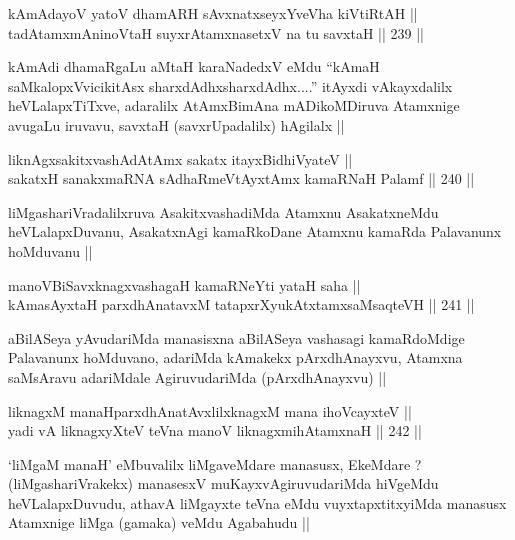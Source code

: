 \begin{shl}
kAmAdayoV yatoV dhamARH sAvxnatxseyxYveVha kiVtiRtAH || \\
tadAtamxmAninoV\s taH suyxrAtamxnasetxV na tu savxtaH ||  239 ||  
\end{shl}

\begin{artha}
kAmAdi dhamaRgaLu aMtaH karaNadedxV eMdu ``kAmaH saMkalopxVvicikitAsx
sharxdAdhx\s sharxdAdhx....'' itAyxdi vAkayxdalilx heVLalapxTiTxve,
adaralilx AtAmxBimAna mADikoMDiruva Atamxnige avugaLu iruvavu, savxtaH
(savxrUpadalilx) hAgilalx ||
\end{artha}

\begin{shl}
liknAgxsakitxvashAdAtAmx sakatx itayxBidhiVyateV || \\
sakatxH sanakxmaRNA sAdhaRmeVtAyxtAmx kamaRNaH Palamf ||  240 ||  
\end{shl}

\begin{artha}
liMgashariVradalilxruva AsakitxvashadiMda Atamxnu AsakatxneMdu
heVLalapxDuvanu, AsakatxnAgi kamaRkoDane Atamxnu kamaRda Palavanunx
hoMduvanu ||
\end{artha}

\begin{shl}
manoVBiSavxknagxvashagaH kamaRNeYti yataH saha || \\
kAmasAyxtaH parxdhAnatavxM tatapxrXyukAtxtamxsaMsaqteVH ||  241 ||  
\end{shl}

\begin{artha}
aBilASeya yAvudariMda manasisxna aBilASeya vashasagi kamaRdoMdige
Palavanunx hoMduvano, adariMda kAmakekx pArxdhAnayxvu, Atamxna
saMsAravu adariMdale AgiruvudariMda (pArxdhAnayxvu) ||
\end{artha}


\begin{shl}
liknagxM manaHparxdhAnatAvxlilxknagxM mana ihoVcayxteV || \\
yadi vA liknagxyXteV teVna manoV liknagxmihA\s \s tamxnaH ||  242 ||  
\end{shl}

\begin{artha}
`liMgaM manaH' eMbuvalilx liMgaveMdare manasusx, EkeMdare ?
  (liMgashariVrakekx) manasesxV muKayxvAgiruvudariMda hiVgeMdu
  heVLalapxDuvudu, athavA liMgayxte teVna eMdu vuyxtapxtitxyiMda
  manasusx Atamxnige liMga (gamaka) veMdu Agabahudu ||
\end{artha}

